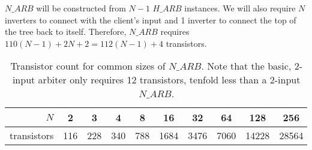 \documentclass[aer.tex]{subfiles}
\begin{document}
$N\_ARB$ will be constructed from $N-1$ $H\_ARB$ instances. We will also require $N$ inverters to connect with the client's input and 1 inverter to connect the top of the tree back to itself. Therefore, $N\_ARB$ requires $110(N-1)+2N+2=112(N-1)+4$ transistors.

\begin{table}
  \centering
  \begin{tabular}{|r|c|c|c|c|c|c|c|c|c|}
    \hline
    $N$ & 2 & 3 & 4 & 8 & 16 & 32 & 64 & 128 & 256 \\
    \hline
    transistors & 116 & 228 & 340 & 788 & 1684 & 3476 & 7060 & 14228 & 28564 \\
    \hline
  \end{tabular}
  \caption{\label{tab:n_arb_cost}Transistor count for common sizes of $N\_ARB$. Note that the basic, 2-input arbiter only requires 12 transistors, tenfold less than a 2-input $N\_ARB$.}
\end{table}

\end{document}
